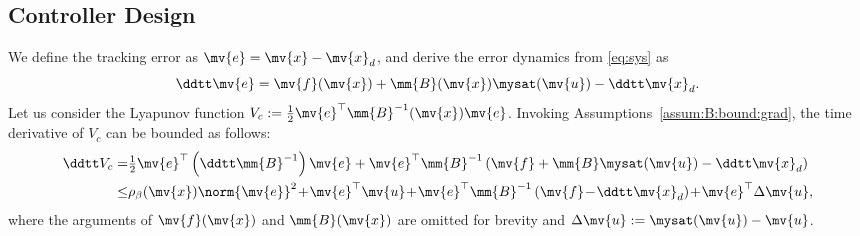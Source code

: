 \documentclass[letterpaper, journal]{IEEEtran}
\providecommand{\DIFaddbegin}{} %
\providecommand{\DIFaddend}{} %
\providecommand{\DIFdelbegin}{} %
\providecommand{\DIFdelend}{} %
\begin{document}
\subsection{Controller Design} \label{sec:main:result:sub:ctrl:design}

We define the tracking error as $\mv{e} = \mv{x} - \mv{x}_d$, and derive the error dynamics from \eqref{eq:sys} as
\begin{equation} \label{eq:error:dyn}
    \ddtt\mv{e}
    =
    \mv{f}(\mv{x}) + \mm{B}(\mv{x})\mysat(\mv{u}) - \ddtt\mv{x}_d
    .
\end{equation}
Let us consider the Lyapunov function $V_c:=\tfrac{1}{2}\mv{e}^\top\mm{B}^{-1}(\mv{x})\mv{e}$.
Invoking Assumptions~\ref{assum:B:bound:grad}, the time derivative of $V_c$ can be bounded as follows:
\DIFdelbegin %
\DIFdelend \DIFaddbegin \begin{align} \label{eq:Vc:dot:1} \nonumber
  \ddtt V_c
  =&
  \tfrac{1}{2}\mv{e}^\top
  \left(
    \ddtt\mm{B}^{-1}
  \right)
  \mv{e}
  +
  \mv{e}^\top\mm{B}^{-1}
  \left(
    \mv{f} + \mm{B}\mysat(\mv{u}) 
    - \ddtt\mv{x}_d
  \right)
  \\
  \le&
  \rho_{\beta}(\mv{x})
  \norm{\mv{e}}^2
  \!+\!
  \mv{e}^\top\mv{u}
  \!+\!
  \mv{e}^\top\mm{B}^{-1}
  \left(
    \mv{f} \!-\! \ddtt\mv{x}_d
  \right)
  \!+\!
  \mv{e}^\top
  \Delta\mv{u}
  ,
\end{align}\DIFaddend 
where the arguments of $\mv{f}(\mv{x})$ and $\mm{B}(\mv{x})$ are omitted for brevity and $\Delta\mv{u} := \mysat(\mv{u}) - \mv{u}$.
\end{document}
